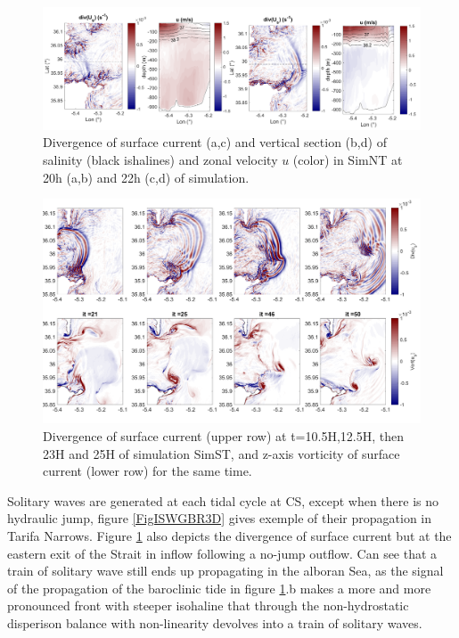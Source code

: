 \begin{figure}[!h]
 \centering
 \includegraphics[width=1.\textwidth]{./GBR3D/coupesISW_ME2-2.png}
 \caption {Divergence of surface current (a,c) and vertical section (b,d) of salinity (black ishalines) and zonal velocity $u$ (color) in SimNT at 20h (a,b) and 22h (c,d) of simulation.}
  \label{FigISWNT}
\end{figure}



\begin{figure}[!h]
 \centering
\includegraphics[width=\linewidth]{./GBR3D/FigTourbVE2.png}
 \caption {Divergence of surface current (upper row) at t=10.5H,12.5H, then 23H and 25H of simulation SimST,  and z-axis vorticity of surface current (lower row) for the same time.}
 \label{FigeddGBR3D}
\end{figure}

Solitary waves are generated at each tidal cycle at CS, except when there is no hydraulic jump, figure \ref{FigISWGBR3D} gives exemple of their propagation in Tarifa Narrows. Figure \ref{FigISWNT} also depicts the divergence of surface current but at the eastern exit of the Strait in inflow following a no-jump outflow. Can see that a train of solitary wave still ends up propagating in the alboran Sea, as the signal of the propagation of the baroclinic tide in figure \ref{FigISWNT}.b makes a more and more pronounced front with steeper isohaline that through the non-hydrostatic disperison balance with non-linearity devolves into a train of solitary waves. 

